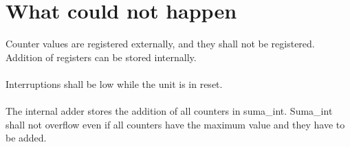 \section{What could not happen}
Counter values are registered externally, and they shall not be registered. Addition of registers can be stored internally.\\
\\
Interruptions shall be low while the unit is in reset.\\
\\
The internal adder stores the addition of all counters in suma\_int. Suma\_int shall not overflow even if all counters have the maximum value and they have to be added.\\
\\

